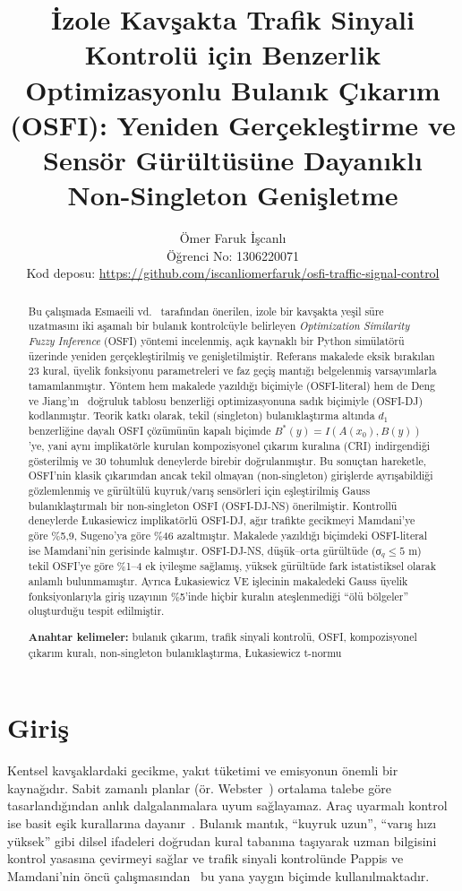 \documentclass[11pt,a4paper]{article}
\title{\textbf{İzole Kavşakta Trafik Sinyali Kontrolü için Benzerlik Optimizasyonlu Bulanık Çıkarım (OSFI): Yeniden Gerçekleştirme ve Sensör Gürültüsüne Dayanıklı Non-Singleton Genişletme}}
\author{Ömer Faruk İşcanlı\\[0.2em]
\small Öğrenci No: 1306220071\\
\small Kod deposu: \url{https://github.com/iscanliomerfaruk/osfi-traffic-signal-control}}
\date{}
\theoremstyle{definition}
\newcommand{\osfins}{OSFI-DJ-NS}
\begin{document}
\maketitle

\begin{abstract}
\noindent Bu çalışmada Esmaeili vd.~\cite{esmaeili2025osfi} tarafından önerilen, izole bir kavşakta yeşil süre uzatmasını iki aşamalı bir bulanık kontrolcüyle belirleyen \emph{Optimization Similarity Fuzzy Inference} (OSFI) yöntemi incelenmiş, açık kaynaklı bir Python simülatörü üzerinde yeniden gerçekleştirilmiş ve genişletilmiştir. Referans makalede eksik bırakılan 23 kural, üyelik fonksiyonu parametreleri ve faz geçiş mantığı belgelenmiş varsayımlarla tamamlanmıştır. Yöntem hem makalede yazıldığı biçimiyle (OSFI-literal) hem de Deng ve Jiang'ın~\cite{deng2014osfi} doğruluk tablosu benzerliği optimizasyonuna sadık biçimiyle (OSFI-DJ) kodlanmıştır. Teorik katkı olarak, tekil (singleton) bulanıklaştırma altında $d_1$ benzerliğine dayalı OSFI çözümünün kapalı biçimde $B^*(y)=I(A(x_0),B(y))$'ye, yani aynı implikatörle kurulan kompozisyonel çıkarım kuralına (CRI) indirgendiği gösterilmiş ve 30 tohumluk deneylerde birebir doğrulanmıştır. Bu sonuçtan hareketle, OSFI'nin klasik çıkarımdan ancak tekil olmayan (non-singleton) girişlerde ayrışabildiği gözlemlenmiş ve gürültülü kuyruk/varış sensörleri için eşleştirilmiş Gauss bulanıklaştırmalı bir non-singleton OSFI (\osfins) önerilmiştir. Kontrollü deneylerde Łukasiewicz implikatörlü OSFI-DJ, ağır trafikte gecikmeyi Mamdani'ye göre \%5,9, Sugeno'ya göre \%46 azaltmıştır. Makalede yazıldığı biçimdeki OSFI-literal ise Mamdani'nin gerisinde kalmıştır. \osfins, düşük--orta gürültüde (σ$_q\le5$ m) tekil OSFI'ye göre \%1--4 ek iyileşme sağlamış, yüksek gürültüde fark istatistiksel olarak anlamlı bulunmamıştır. Ayrıca Łukasiewicz VE işlecinin makaledeki Gauss üyelik fonksiyonlarıyla giriş uzayının \%5'inde hiçbir kuralın ateşlenmediği ``ölü bölgeler'' oluşturduğu tespit edilmiştir.

\smallskip\noindent\textbf{Anahtar kelimeler:} bulanık çıkarım, trafik sinyali kontrolü, OSFI, kompozisyonel çıkarım kuralı, non-singleton bulanıklaştırma, Łukasiewicz t-normu
\end{abstract}

\section{Giriş}
\label{sec:intro}

Kentsel kavşaklardaki gecikme, yakıt tüketimi ve emisyonun önemli bir kaynağıdır. Sabit zamanlı planlar (ör. Webster~\cite{webster1958}) ortalama talebe göre tasarlandığından anlık dalgalanmalara uyum sağlayamaz. Araç uyarmalı kontrol ise basit eşik kurallarına dayanır~\cite{eom2020}. Bulanık mantık, ``kuyruk uzun'', ``varış hızı yüksek'' gibi dilsel ifadeleri doğrudan kural tabanına taşıyarak uzman bilgisini kontrol yasasına çevirmeyi sağlar ve trafik sinyali kontrolünde Pappis ve Mamdani'nin öncü çalışmasından~\cite{pappis1977} bu yana yaygın biçimde kullanılmaktadır.
\end{document}
